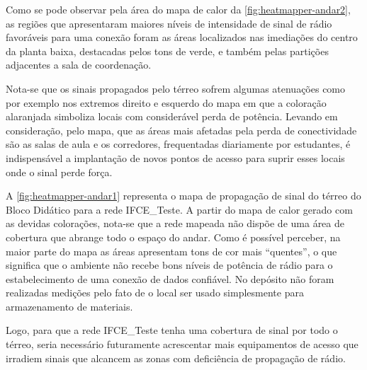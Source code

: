 Como se pode observar pela área do mapa de calor da \autoref{fig:heatmapper-andar2}, as regiões que apresentaram maiores níveis de intensidade de sinal de rádio favoráveis para uma conexão foram as áreas localizados nas imediações do centro da planta baixa, destacadas pelos tons de verde, e também pelas partições adjacentes a sala de coordenação.

Nota-se que os sinais propagados pelo térreo sofrem algumas atenuações como por exemplo nos extremos direito e esquerdo do mapa em que a coloração alaranjada simboliza locais com considerável perda de potência. Levando em consideração, pelo mapa, que as áreas mais afetadas pela perda de conectividade são as salas de aula e os corredores, frequentadas diariamente por estudantes, é indispensável a implantação de novos pontos de acesso para suprir esses locais onde o sinal perde força.

A \autoref{fig:heatmapper-andar1} representa o mapa de propagação de sinal do térreo do Bloco Didático para a rede IFCE\_Teste. A partir do mapa de calor gerado com as devidas colorações, nota-se que a rede mapeada não dispõe de uma área de cobertura que abrange todo o espaço do andar. Como é possível perceber, na maior parte do mapa as áreas apresentam tons de cor mais ``quentes'', o que significa que o ambiente não recebe bons níveis de potência de rádio para o estabelecimento de uma conexão de dados confiável. No depósito não foram realizadas medições pelo fato de o local ser usado simplesmente para armazenamento de materiais.

Logo, para que a rede IFCE\_Teste tenha uma cobertura de sinal por todo o térreo, seria necessário futuramente acrescentar mais equipamentos de acesso que irradiem sinais que alcancem as zonas com deficiência de propagação de rádio.

\begin{figure}[H]
	\centering
\end{figure}



